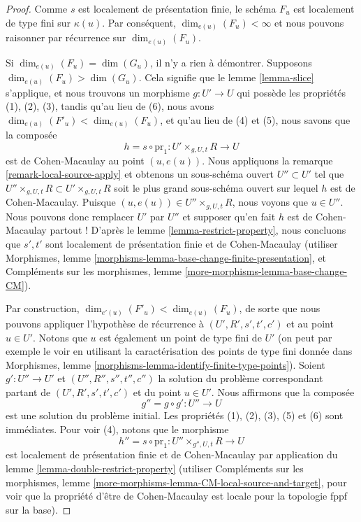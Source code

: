 \begin{proof}
Comme $s$ est localement de présentation finie, le schéma $F_u$ est
localement de type fini sur $\kappa(u)$. Par conséquent,
$\dim_{e(u)}(F_u) < \infty$ et nous pouvons raisonner par récurrence sur
$\dim_{e(u)}(F_u)$.

\medskip\noindent
Si $\dim_{e(u)}(F_u) = \dim(G_u)$, il n'y a rien à démontrer.
Supposons $\dim_{e(u)}(F_u) > \dim(G_u)$. Cela signifie que le
lemme \ref{lemma-slice}
s'applique, et nous trouvons un morphisme $g : U' \to U$ qui possède
les propriétés (1), (2), (3), tandis qu'au lieu de (6), nous avons
$\dim_{e(u)}(F'_u) < \dim_{e(u)}(F_u)$,
et qu'au lieu de (4) et (5), nous savons que la composée
$$
h = s \circ \text{pr}_1 : U' \times_{g, U, t} R \longrightarrow U
$$
est de Cohen-Macaulay au point $(u, e(u))$. Nous appliquons la
remarque \ref{remark-local-source-apply}
et obtenons un sous-schéma ouvert $U'' \subset U'$ tel que
$U'' \times_{g, U, t} R \subset U' \times_{g, U, t} R$
soit le plus grand sous-schéma ouvert sur lequel $h$ est de Cohen-Macaulay.
Puisque $(u, e(u)) \in U'' \times_{g, U, t} R$, nous voyons que $u \in U''$.
Nous pouvons donc remplacer $U'$ par $U''$ et supposer qu'en fait $h$ est
de Cohen-Macaulay partout ! D'après le
lemme \ref{lemma-restrict-property},
nous concluons que $s', t'$ sont localement de
présentation finie et de Cohen-Macaulay (utiliser
Morphismes, lemme \ref{morphisms-lemma-base-change-finite-presentation},
et
Compléments sur les morphismes, lemme \ref{more-morphisms-lemma-base-change-CM}).

\medskip\noindent
Par construction, $\dim_{e'(u)}(F'_u) < \dim_{e(u)}(F_u)$,
de sorte que nous pouvons appliquer l'hypothèse de récurrence à $(U', R', s', t', c')$
et au point $u \in U'$. Notons que $u$ est également un point de type fini
de $U'$ (on peut par exemple le voir en utilisant la caractérisation des
points de type fini donnée dans
Morphismes, lemme \ref{morphisms-lemma-identify-finite-type-points}).
Soient $g' : U'' \to U'$ et $(U'', R'', s'', t'', c'')$ la solution
du problème correspondant partant de $(U', R', s', t', c')$
et du point $u \in U'$. Nous affirmons que la composée
$$
g'' = g \circ g' : U'' \longrightarrow U
$$
est une solution du problème initial. Les propriétés (1), (2), (3), (5)
et (6) sont immédiates. Pour voir (4), notons que le morphisme
$$
h'' = s \circ \text{pr}_1 : U'' \times_{g'', U, t} R \longrightarrow U
$$
est localement de présentation finie et de Cohen-Macaulay par application du
lemme \ref{lemma-double-restrict-property}
(utiliser
Compléments sur les morphismes, lemme \ref{more-morphisms-lemma-CM-local-source-and-target},
pour voir que la propriété d'être de Cohen-Macaulay est locale pour la topologie fppf sur la base).
\end{proof}

